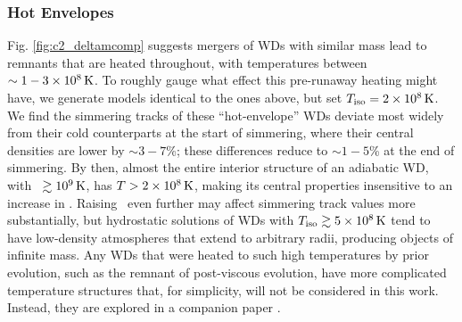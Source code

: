 \subsubsection{Hot Envelopes}
\label{sssec:c5_runaway_ad_hot}




Fig. \ref{fig:c2_deltamcomp} suggests mergers of WDs with similar mass lead to remnants that are heated throughout, with temperatures between $\sim 1 - 3\times10^8\,\mathrm{K}$.  To roughly gauge what effect this pre-runaway heating might have, we generate models identical to the ones above, but set $\tempiso = 2\times10^8\,\mrm{K}$.  We find the simmering tracks of these ``hot-envelope'' WDs deviate most widely from their cold counterparts at the start of simmering, where their central densities are lower by $\sim3-7$\%; these differences reduce to $\sim1 - 5$\% at the end of simmering.  By then, almost the entire interior structure of an adiabatic WD, with \Tc\ $\gtrsim10^9\,\mathrm{K}$, has $T > 2\times10^8\,\mathrm{K}$, making its central properties insensitive to an increase in \tempiso.  Raising \tempiso\ even further may affect simmering track values more substantially, but hydrostatic solutions of WDs with $\tempiso \gtrsim 5\times10^8\,\mrm{K}$ tend to have low-density atmospheres that extend to arbitrary radii, producing objects of infinite mass.  Any WDs that were heated to such high temperatures by prior evolution, such as the remnant of \cite{ji+13} post-viscous evolution, have more complicated temperature structures that, for simplicity, will not be considered in this work.  Instead, they are explored in a companion paper \citep{herizv16}.

